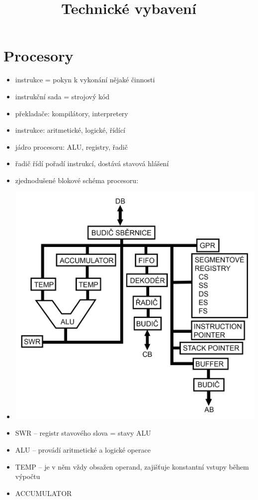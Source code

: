 \documentclass[a4paper,12pt]{article}
\title{Technické vybavení}
\author{}
\date{}
\providecommand{\tightlist}{%
\setlength{\itemsep}{0pt}\setlength{\parskip}{0pt}}
\begin{document}
\maketitle

\section{Procesory}

\begin{itemize}
  \tightlist
  \item instrukce = pokyn k vykonání nějaké činnosti
  \item instrukční sada = strojový kód
  \item překladače: kompilátory, interpretery
  \item instrukce: aritmetické, logické, řídící
  \item jádro procesoru: ALU, registry, řadič
  \item řadič řídí pořadí instrukcí, dostává stavová hlášení
  \item zjednodušené blokové schéma procesoru:
  \item[] \includegraphics[width=16cm]{ref/blokove-schema-procesoru.png}
  \newpage
  \item SWR -- registr stavového slova = stavy ALU
  \item ALU -- provádí aritmetické a logické operace
  \item TEMP -- je v něm vždy obsažen operand, zajišťuje konstantní vstupy
  během výpočtu
  \item ACCUMULATOR
  

\end{itemize}
\end{document}

